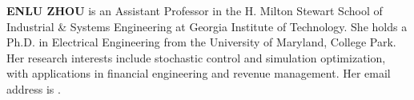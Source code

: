 \documentclass{scspaperproc}
\theoremstyle{scsthe}
\begin{document}
\textbf{\uppercase{ENLU ZHOU}} is an Assistant Professor in the H. Milton Stewart School of Industrial \& Systems Engineering at Georgia Institute of Technology. She holds a Ph.D. in Electrical Engineering from the University of Maryland, College Park. Her research interests include stochastic control and simulation optimization, with applications in financial engineering and revenue management. Her email address is .

%
%
%
\end{document}
